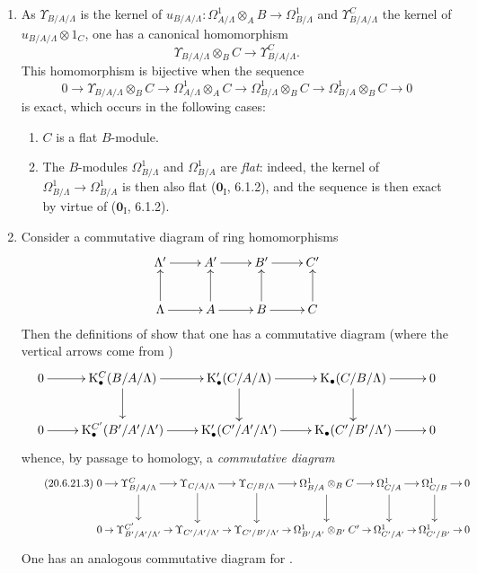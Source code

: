\begin{remarks}[20.6.21]
\label{0.20.6.21}
\begin{enumerate}
  \item[\rm(i)] As $\Upsilon_{B/A/\Lambda}$ is the kernel of $u_{B/A/\Lambda}:\Omega^1_{A/\Lambda}\otimes_A B\to\Omega^1_{B/\Lambda}$ and $\Upsilon^C_{B/A/\Lambda}$ the kernel of $u_{B/A/\Lambda}\otimes 1_C$, one has a canonical homomorphism
\begin{equation}
\tag{20.6.21.1}
  \label{0.20.6.21.1}
  \Upsilon_{B/A/\Lambda}\otimes_B C\to\Upsilon^C_{B/A/\Lambda}.
\end{equation}
This homomorphism is bijective when the sequence
\begin{equation}
\tag{20.6.21.2}
  \label{0.20.6.21.2}
  0\to\Upsilon_{B/A/\Lambda}\otimes_B C\to\Omega^1_{A/\Lambda}\otimes_A C\to\Omega^1_{B/\Lambda}\otimes_B C\to\Omega^1_{B/A}\otimes_B C\to 0
\end{equation}
is exact, which occurs in the following cases:
\begin{enumerate}
  \item[$1^\circ$] $C$ is a flat $B$-module.
  \item[$2^\circ$] The $B$-modules $\Omega^1_{B/\Lambda}$ and $\Omega^1_{B/A}$ are \emph{flat}: indeed, the kernel of $\Omega^1_{B/\Lambda}\to\Omega^1_{B/A}$ is then also flat ($\mathbf{0}_{\mathrm I}$, 6.1.2), and the sequence  is then exact by virtue of ($\mathbf{0}_{\mathrm I}$, 6.1.2).
\end{enumerate}
  \item[\rm(ii)] Consider a commutative diagram of ring homomorphisms
\[
\xymatrix{
  \Lambda' \ar[r] & A' \ar[r] & B' \ar[r] & C' \\
  \Lambda \ar[u] \ar[r] & A \ar[u] \ar[r] & B \ar[u] \ar[r] & C \ar[u]
}
\]
Then the definitions of  show that one has a commutative diagram (where the vertical arrows come from )
\[
\xymatrix{
  0 \ar[r] & \mathrm{K}^C_\bullet(B/A/\Lambda) \ar[r] \ar[d] & \mathrm{K}'_\bullet(C/A/\Lambda) \ar[r] \ar[d] & \mathrm{K}_\bullet(C/B/\Lambda) \ar[r] \ar[d] & 0 \\
  0 \ar[r] & \mathrm{K}^{C'}_\bullet(B'/A'/\Lambda') \ar[r] & \mathrm{K}'_\bullet(C'/A'/\Lambda') \ar[r] & \mathrm{K}_\bullet(C'/B'/\Lambda') \ar[r] & 0
}
\]
whence, by passage to homology, a \emph{commutative diagram}
\begin{equation}
\tag{20.6.21.3}
  \label{0.20.6.21.3}
\xymatrix@C=0.7em{
  0 \ar[r] & \Upsilon^C_{B/A/\Lambda} \ar[r] \ar[d] & \Upsilon_{C/A/\Lambda} \ar[r] \ar[d] & \Upsilon_{C/B/\Lambda} \ar[r] \ar[d] & \Omega^1_{B/A}\otimes_B C \ar[r] \ar[d] & \Omega^1_{C/A} \ar[r] \ar[d] & \Omega^1_{C/B} \ar[r] \ar[d] & 0 \\
  0 \ar[r] & \Upsilon^{C'}_{B'/A'/\Lambda'} \ar[r] & \Upsilon_{C'/A'/\Lambda'} \ar[r] & \Upsilon_{C'/B'/\Lambda'} \ar[r] & \Omega^1_{B'/A'}\otimes_{B'} C' \ar[r] & \Omega^1_{C'/A'} \ar[r] & \Omega^1_{C'/B'} \ar[r] & 0
}
\end{equation}
One has an analogous commutative diagram for .
\end{enumerate}
\end{remarks}

